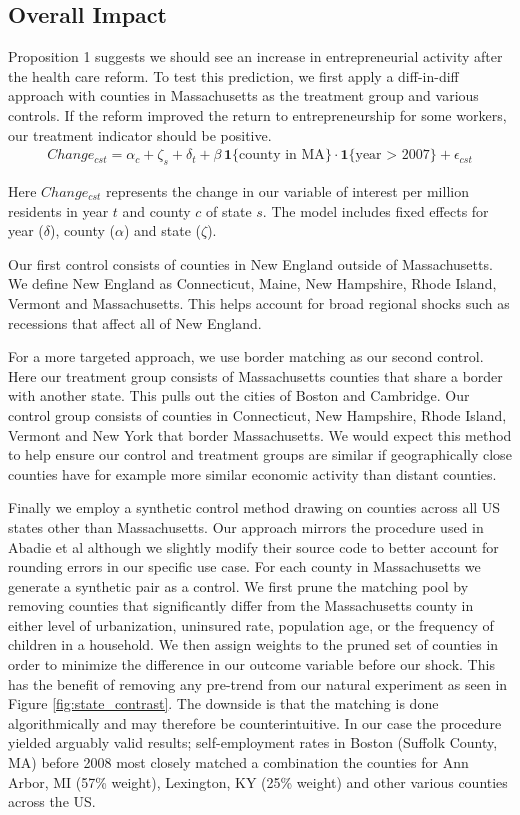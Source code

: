 \documentclass[12pt]{article}
\begin{document}
\subsection{Overall Impact}

Proposition 1 suggests we should see an increase in entrepreneurial activity after the health care reform. To test this prediction, we first apply a diff-in-diff approach with counties in Massachusetts as the treatment group and various controls. If the reform improved the return to entrepreneurship for some workers, our treatment indicator should be positive. 
\begin{align}
Change_{cst} = \alpha_c + \zeta_s + \delta_t + \beta \, \mathbf{1}\{\text{county in MA}\} \cdot \mathbf{1}\{\text{year > 2007}\} + \epsilon_{cst}
\end{align}

Here $Change_{cst}$ represents the change in our variable of interest per million residents in year $t$ and county $c$ of state $s$. The model includes fixed effects for year ($\delta$), county ($\alpha$) and state ($\zeta$).

Our first control consists of counties in New England outside of Massachusetts. We define New England as Connecticut, Maine, New Hampshire, Rhode Island, Vermont and Massachusetts. This helps account for broad regional shocks such as recessions that affect all of New England. 

For a more targeted approach, we use border matching as our second control. Here our treatment group consists of Massachusetts counties that share a border with another state. This pulls out the cities of Boston and Cambridge. Our control group consists of counties in Connecticut, New Hampshire, Rhode Island, Vermont and New York that border Massachusetts. We would expect this method to help ensure our control and treatment groups are similar if geographically close counties  have for example more similar economic activity than distant counties. 

Finally we employ a synthetic control method drawing on counties across all US states other than Massachusetts. Our approach mirrors the procedure used in Abadie et al \cite{abadie} although we slightly modify their source code to better account for rounding errors in our specific use case. For each county in Massachusetts we generate a synthetic pair as a control. We first prune the matching pool by removing counties that significantly differ from the Massachusetts county in either level of urbanization, uninsured rate, population age, or the frequency of children in a household. We then assign weights to the pruned set of counties in order to minimize the difference in our outcome variable before our shock. This has the benefit of removing any pre-trend from our natural experiment as seen in Figure \ref{fig:state_contrast}. The downside is that the matching is done algorithmically and may therefore be counterintuitive. In our case the procedure yielded arguably valid results; self-employment rates in Boston (Suffolk County, MA) before 2008 most closely matched a combination the counties for Ann Arbor, MI (57\% weight), Lexington, KY (25\% weight) and other various counties across the US. 
\end{document}
